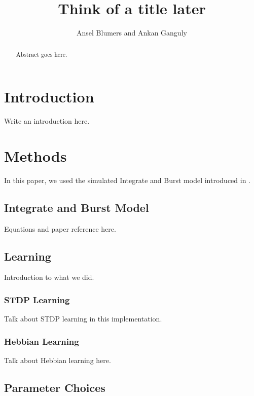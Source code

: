 \documentclass[12pt, draft]{article}
\begin{document}
\newtheorem{prop}{Proposition}

\title{Think of a title later}
\author{Ansel Blumers and Ankan Ganguly}
\maketitle

\begin{abstract}
Abstract goes here.
\end{abstract}

\newpage

\tableofcontents

\newpage

\section{Introduction}

Write an introduction here.

\section{Methods}

In this paper, we used the simulated Integrate and Burst model introduced in \cite{Fiete}.

\subsection{Integrate and Burst Model}

Equations and paper reference here.

\subsection{Learning}

Introduction to what we did.

\subsubsection{STDP Learning}

Talk about STDP learning in this implementation.

\subsubsection{Hebbian Learning}

Talk about Hebbian learning here.

\subsection{Parameter Choices}
\end{document}
